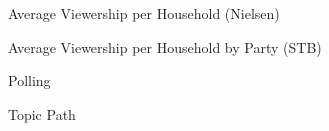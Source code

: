 \begin{figure}%
    \centering
    \qquad
    \caption{Average Viewership per Household (Nielsen)}%
    \label{fig:example}%
\end{figure}   






\begin{figure}%
    \centering
    \qquad
    \caption{Average Viewership per Household by Party (STB)}%
    \label{fig:example}%
\end{figure}




\begin{figure}%
    \centering
    \qquad
    \caption{Polling}%
    \label{fig:example}%
\end{figure}

\begin{figure}%
    \centering
    \caption{Topic Path}%
    \label{fig:example}%
\end{figure}



